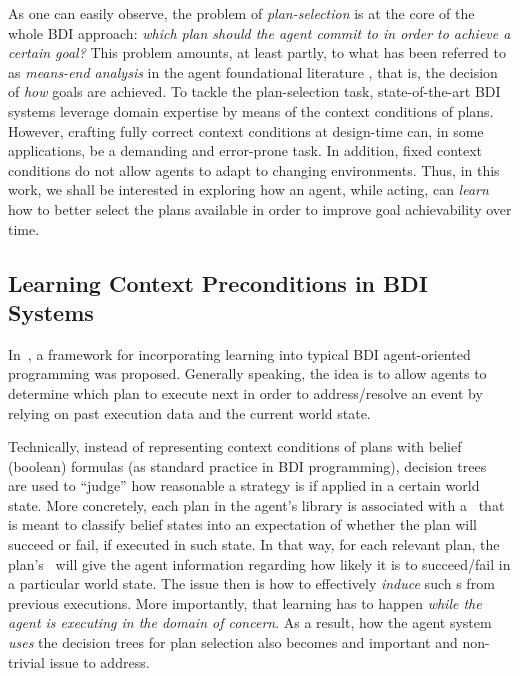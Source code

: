 As one can easily observe, the problem of \textit{plan-selection} is at the core
of the whole BDI approach:
\emph{which plan should the agent commit to in order to achieve a certain goal?}
This problem amounts, at least partly, to what has been referred to as
\emph{means-end analysis} in the agent foundational literature
\cite{Pollack92-IRMA,Bratman88}, that is, the decision of \textit{how} goals are
achieved.
To tackle the plan-selection task, state-of-the-art BDI systems leverage domain
expertise by means of the context conditions of plans. However, crafting fully
correct context conditions at design-time can, in some applications, be a
demanding and error-prone task. In addition, fixed context conditions do not
allow agents to adapt to changing environments.
 Thus, in this work, we shall be interested in
exploring how an agent, while acting, can \emph{learn} how to better select the
plans available in order to improve goal achievability over time.



















\subsection{Learning Context Preconditions in BDI Systems}\label{sec:BDI_learning}


In~\cite{Airiau:IJAT:09}, a framework for incorporating learning into typical BDI
agent-oriented programming was proposed.
Generally speaking, the idea is to allow agents to determine which plan to
execute next in order to address/resolve an event by relying on past execution
data and the current world state.



Technically, instead of representing context conditions of plans with belief
(boolean) formulas (as standard practice in BDI programming), decision
trees~\cite{Mitchell97:ML} are used to ``judge'' how reasonable a strategy is if
applied in a certain world state.
More concretely, each plan in the agent's library is associated with a \dt\ that
is meant to classify belief states into an expectation of whether the plan will
succeed or fail, if executed in such state. In that way, for each relevant plan,
the plan's \dt\ will give the agent information regarding how likely it is to
succeed/fail in a particular world state.
The issue then is how to effectively \emph{induce} such \dt{}s from previous
executions. More importantly, that learning has to happen \emph{while the agent is
executing in the domain of concern}. As a result, how the agent system
\emph{uses} the decision trees for plan selection also becomes and important
and non-trivial issue to address.


